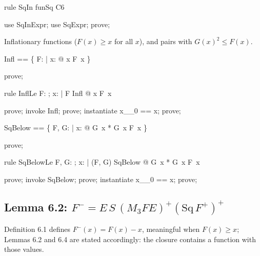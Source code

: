 \documentclass{article}
\begin{document}
\begin{theorem}{rule SqIn}
  funSq \in C6
\end{theorem}

\begin{zproof}
use SqInExpr;
use SqExpr;
prove;
\end{zproof}

Inflationary functions ($F(x) \ge x$ for all $x$), and pairs with $G(x)^2 \le F(x)$.

\begin{zed}
  Infl == \{ F: \nat \fun \nat | \forall x: \nat @ x \leq F~x \}
\end{zed}

\begin{zproof}
prove;
\end{zproof}

\begin{theorem}{rule InflLe}
  \forall F: \nat \fun \nat; x: \nat | F \in Infl @ x \leq F~x
\end{theorem}

\begin{zproof}
prove;
invoke Infl;
prove;
instantiate x\_\_0 == x;
prove;
\end{zproof}

\begin{zed}
  SqBelow == \{ F, G: \nat \fun \nat | \forall x: \nat @ G~x * G~x \leq F~x \}
\end{zed}

\begin{zproof}
prove;
\end{zproof}

\begin{theorem}{rule SqBelowLe}
  \forall F, G: \nat \fun \nat; x: \nat | (F, G) \in SqBelow @ G~x * G~x \leq F~x
\end{theorem}

\begin{zproof}
prove;
invoke SqBelow;
prove;
instantiate x\_\_0 == x;
prove;
\end{zproof}

\subsection{Lemma 6.2: $F^- = E\,S\,(M_3 F E)^+ (\mathrm{Sq}\,F^+)^+$}

Definition 6.1 defines $F^-(x) = F(x) - x$, meaningful when $F(x) \ge x$; Lemmas 6.2 and 6.4
are stated accordingly: the closure contains a function with those values.
\end{document}
